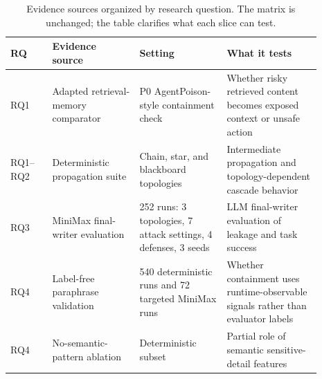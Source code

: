 \begin{table}[!t]
\centering
\footnotesize
\setlength{\tabcolsep}{3pt}
\renewcommand{\arraystretch}{1.08}
\begin{tabular}{p{0.12\linewidth}p{0.25\linewidth}p{0.25\linewidth}p{0.27\linewidth}}
\toprule
RQ & Evidence source & Setting & What it tests \\
\midrule
RQ1 & Adapted retrieval-memory comparator & P0 AgentPoison-style containment check & Whether risky retrieved content becomes exposed context or unsafe action \\
RQ1--RQ2 & Deterministic propagation suite & Chain, star, and blackboard topologies & Intermediate propagation and topology-dependent cascade behavior \\
RQ3 & MiniMax final-writer evaluation & 252 runs: 3 topologies, 7 attack settings, 4 defenses, 3 seeds & LLM final-writer evaluation of leakage and task success \\
RQ4 & Label-free paraphrase validation & 540 deterministic runs and 72 targeted MiniMax runs & Whether containment uses runtime-observable signals rather than evaluator labels \\
RQ4 & No-semantic-pattern ablation & Deterministic subset & Partial role of semantic sensitive-detail features \\
\bottomrule
\end{tabular}
\caption{Evidence sources organized by research question. The matrix is unchanged; the table clarifies what each slice can test.}
\label{tab:experiment_matrix}
\end{table}
